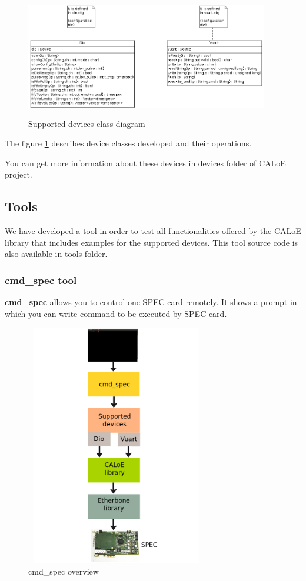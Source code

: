 \begin{figure}[H]
\centering
\includegraphics[width=400px,height=200px]{img/caloe_devices.png}
\caption{Supported devices class diagram}
\label{supported_dev_cd_img}
\end{figure}

The figure \ref{supported_dev_cd_img} describes device classes developed and their operations.

You can get more information about these devices in devices folder of CALoE project.

\subsection{Tools}

We have developed a tool in order to test all functionalities offered by the CALoE library that includes examples for the supported devices. This tool source code is also available in tools folder.

\subsubsection{cmd\_spec tool}

\textbf{cmd\_spec} allows you to control one SPEC card remotely. It shows a prompt in which you can write command to be executed by SPEC card.

\begin{figure}[H]
\centering
\includegraphics[width=300px,height=400px]{img/cmd_spec.png}
\caption{cmd\_spec overview}
\label{cmd_spec_overview_img}
\end{figure}

